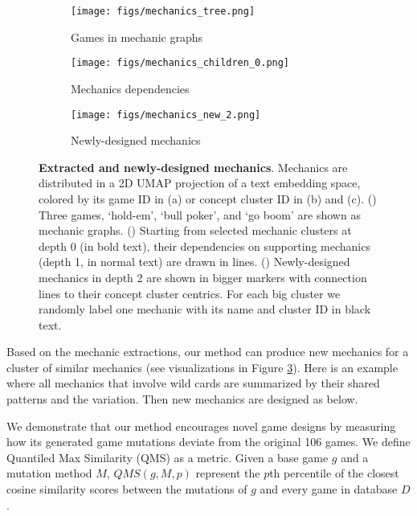 \begin{figure*}[ht]
  \centering
    \begin{subfigure}[t]{.3\linewidth}
        \texttt{[image: figs/mechanics\_tree.png]}
        \caption{Games in mechanic graphs}
        \label{fig:mechanic_graphs}
    \end{subfigure}
    \hfill
    \begin{subfigure}[t]{.3\linewidth}
        \texttt{[image: figs/mechanics\_children\_0.png]}
        \caption{Mechanics dependencies}
        \label{fig:mechanic_dependencies}
    \end{subfigure}
    \hfill
    \begin{subfigure}[t]{.3\linewidth}
        \texttt{[image: figs/mechanics\_new\_2.png]}
        \caption{Newly-designed mechanics}
        \label{fig:new_mechanics}
    \end{subfigure}
  \caption{\textbf{Extracted and newly-designed mechanics}. Mechanics are distributed in a 2D UMAP projection of a text embedding space, colored by its game ID in (a) or concept cluster ID in (b) and (c). () Three games, `hold-em', `bull poker', and `go boom' are shown as mechanic graphs. () Starting from selected mechanic clusters at depth 0 (in bold text), their dependencies on supporting mechanics (depth 1, in normal text) are drawn in lines. () Newly-designed mechanics in depth 2 are shown in bigger markers with connection lines to their concept cluster centrics. For each big cluster we randomly label one mechanic with its name and cluster ID in black text.}\label{fig:concept_cluster}
\end{figure*}



Based on the mechanic extractions, our method can produce new mechanics for a cluster of similar mechanics (see visualizations in Figure \ref{fig:new_mechanics}). Here is an example where all mechanics that involve wild cards are summarized by their shared patterns and the variation. Then new mechanics are designed as below.



We demonstrate that our method encourages novel game designs by measuring how its generated game mutations deviate from the original 106 games. We define Quantiled Max Similarity (QMS) as a metric. Given a base game $g$ and a mutation method $M$, $QMS(g, M, p)$ represent the $p$th percentile of the closest cosine similarity scores between the mutations of $g$ and every game in database $D$.

